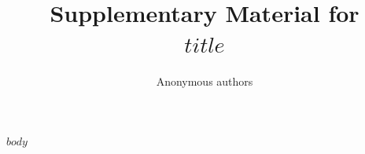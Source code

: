 \documentclass[10pt]{article}
\title{Supplementary Material for\\\textit{$title$}}
\author{Anonymous authors}
\date{}
\begin{document}
\maketitle
\small

$body$
\end{document}
